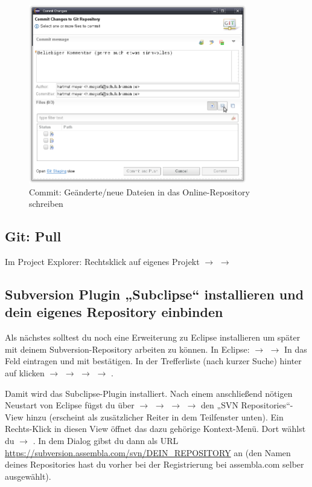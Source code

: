 \begin{figure}[h]
  \centering
   \includegraphics[width=0.85\textwidth]{./inf/SEKII/01_Vorbereitung/Git-Commit.png}
   \caption{Commit: Geänderte/neue Dateien in das Online-Repository schreiben}
   \label{fig:git-commit}
\end{figure}

\subsection{Git: Pull}

Im Project Explorer: Rechtsklick auf eigenes Projekt $\rightarrow$ 
$\rightarrow$ 

\clearpage


\subsection{Subversion Plugin „Subclipse“ installieren und dein eigenes
Repository einbinden} 

Als nächstes solltest du noch eine Erweiterung zu Eclipse installieren um später
mit deinem Sub\-vers\-ion-Repository arbeiten zu können. In Eclipse:
 $\rightarrow$  $\rightarrow$ In
das Feld   eintragen und mit 
bestätigen. In der Trefferliste (nach kurzer Suche) hinter 
auf  klicken $\rightarrow$  $\rightarrow$
 $\rightarrow$  $\rightarrow$
.

Damit wird das Subclipse-Plugin installiert. Nach einem anschließend nötigen
Neustart von Eclipse fügst du über  $\rightarrow$  $\rightarrow$  $\rightarrow$ 
$\rightarrow$  den „SVN Repositories“-View hinzu
(erscheint als zusätzlicher Reiter in dem Teilfenster unten). Ein Rechts-Klick
in diesen View öffnet das dazu gehörige Kontext-Menü. Dort wählst du
 $\rightarrow$ . In dem Dialog
gibst du dann als URL \url{https://subversion.assembla.com/svn/DEIN_REPOSITORY}
an (den Namen deines Repositories hast du vorher bei der Registrierung bei
assembla.com selber ausgewählt).

